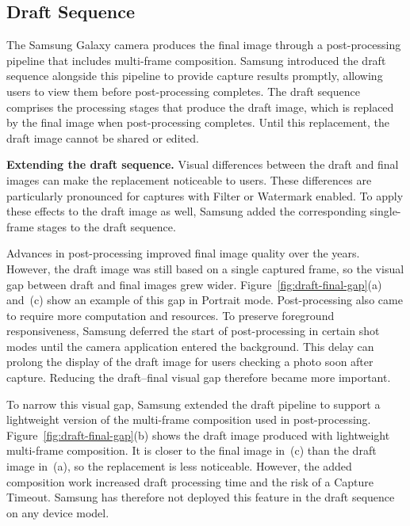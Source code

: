 \subsection{Draft Sequence}
\label{sec:draft-background}

The Samsung Galaxy camera produces the final image through a post-processing pipeline that includes multi-frame composition.
Samsung introduced the draft sequence alongside this pipeline to provide capture results promptly, allowing users to view them before post-processing completes.
The draft sequence comprises the processing stages that produce the draft image, which is replaced by the final image when post-processing completes.
Until this replacement, the draft image cannot be shared or edited.

\smallskip\noindent\textbf{Extending the draft sequence.}
Visual differences between the draft and final images can make the replacement noticeable to users.
These differences are particularly pronounced for captures with Filter or Watermark enabled.
To apply these effects to the draft image as well, Samsung added the corresponding single-frame stages to the draft sequence.



Advances in post-processing improved final image quality over the years.
However, the draft image was still based on a single captured frame, so the visual gap between draft and final images grew wider.
Figure~\ref{fig:draft-final-gap}(a) and~(c) show an example of this gap in Portrait mode.
Post-processing also came to require more computation and resources.
To preserve foreground responsiveness, Samsung deferred the start of post-processing in certain shot modes until the camera application entered the background.
This delay can prolong the display of the draft image for users checking a photo soon after capture.
Reducing the draft--final visual gap therefore became more important.

To narrow this visual gap, Samsung extended the draft pipeline to support a lightweight version of the multi-frame composition used in post-processing.
Figure~\ref{fig:draft-final-gap}(b) shows the draft image produced with lightweight multi-frame composition.
It is closer to the final image in~(c) than the draft image in~(a), so the replacement is less noticeable.
However, the added composition work increased draft processing time and the risk of a Capture Timeout.
Samsung has therefore not deployed this feature in the draft sequence on any device model.
